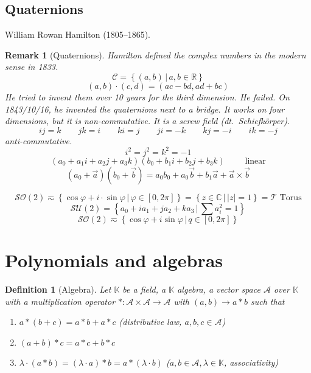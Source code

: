 \documentclass{article}
\newtheorem{definition}{Definition}  \numberwithin{definition}{section}
\newtheorem{remark}{Remark}  \numberwithin{remark}{section}
\newcommand{\setdef}[2]{\left\{\left.#1\,\right|\,#2\right\}}
\newcommand{\card}[1]{\left|#1\right|}
\begin{document}
\subsection{Quaternions}

William Rowan Hamilton (1805--1865).

\begin{remark}[Quaternions]
  Hamilton defined the complex numbers in the modern sense in 1833.
  \[ \mathcal C = \setdef{(a,b)}{a,b \in \mathbb R} \]
  \[ (a,b) \cdot (c, d) = (ac - bd, ad + bc) \]
  He tried to invent them over 10 years for the third dimension.
  He failed.
  On 1843/10/16, he invented the quaternions next to a bridge.
  It works on four dimensions, but it is non-commutative.
  It is a screw field (dt.~\foreignlanguage{german}{Schiefk\"orper}).
  \[ ij = k \qquad jk = i \qquad ki = j \qquad ji = -k \qquad kj = -i \qquad ik = -j \]
  anti-commutative.
  \[ i^2 = j^2 = k^2 = -1 \]
  \[ (a_0 + a_1 i + a_2 j + a_3 k) (b_0 + b_1 i + b_2 j + b_3 k) \qquad \text{ linear} \]
  \[ (a_0 + \vec a) (b_0 + \vec b) = a_0 b_0 + a_0 \vec b + b_1 \vec a + \vec a \times \vec b \]
\end{remark}

\[ \mathcal{SO}(2) \eqsim \setdef{\cos\varphi + i \cdot \sin\varphi}{\varphi \in [0,2\pi]} = \setdef{z \in \mathbb C}{\card{z} = 1} = \mathcal T \text{ Torus} \]
\[ \mathcal{SU}(2) = \setdef{a_0 + i a_1 + j a_2 + k a_3}{\sum a_i^2 = 1} \]
\[ \mathcal{SO}(2) \eqsim \setdef{\cos \varphi + i \sin\varphi}{q \in [0,2\pi]} \]

\section{Polynomials and algebras} %

\begin{definition}[Algebra] %
  Let $\mathbb K$ be a field, a $\mathbb K$ algebra, a vector space $\mathcal A$ over $\mathbb K$
  with a multiplication operator $*: \mathcal A \times \mathcal A \to \mathcal A$ with $(a,b) \to a * b$ such that
  \begin{enumerate}
    \item $a * (b + c) = a * b + a * c$ (distributive law, $a, b, c \in \mathcal A$)
    \item $(a + b) * c = a * c + b * c$
    \item $\lambda \cdot (a * b) = (\lambda \cdot a) * b = a * (\lambda \cdot b)$ ($a, b \in \mathcal A, \lambda \in \mathbb K$, associativity)
  \end{enumerate}
\end{definition}
\end{document}
